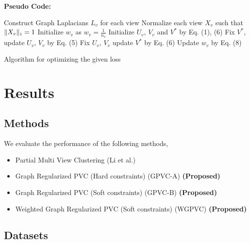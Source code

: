 \documentclass[a4paper]{article}
\begin{document}
	\noindent
	\textbf{Pseudo Code:}	
	\begin{algorithm}
		Construct Graph Laplacians $L_{v}$ for each view\;
		Normalize each view $X_{v}$ such that $\|X_{v}\|_{\text{\tiny1}} = 1 $\;
		Initialize $w_{v}$ as $w_{v}=${\tiny{${\frac{1}{n_{v}}}$}}\;
		Initialize  $U_{v}$, $V_{v}$ and $V^{*}$ by Eq. (1), (6)\;
		{
			{
				{
					Fix $V^{*}$, update $U_{v}$, $V_{v}$ by Eq. (5)\;
				}
			}
			Fix $U_{v}$, $V_{v}$ update $V^{*}$ by Eq. (6)\;		
			Update $w_{v}$ by Eq. (8)\;
		}						
		\caption{Algorithm for optimizing the given loss}
	\end{algorithm}

	\pagebreak

	\section{Results}

	\subsection{Methods}
	
	We evaluate the performance of the following methods,
	\begin{itemize}
	\item {Partial Multi View Clustering (Li et al.) ~\cite{pvc15}}
	\item {Graph Regularized PVC (Hard constraints) (GPVC-A)	\small\textbf{(Proposed)}}
	\item {Graph Regularized PVC (Soft constraints) (GPVC-B)	\small\textbf{(Proposed)}}
	\item {Weighted Graph Regularized PVC (Soft constraints) (WGPVC)	\small\textbf{(Proposed)}}
	\end{itemize}

	\subsection{Datasets}
	
\end{document}
